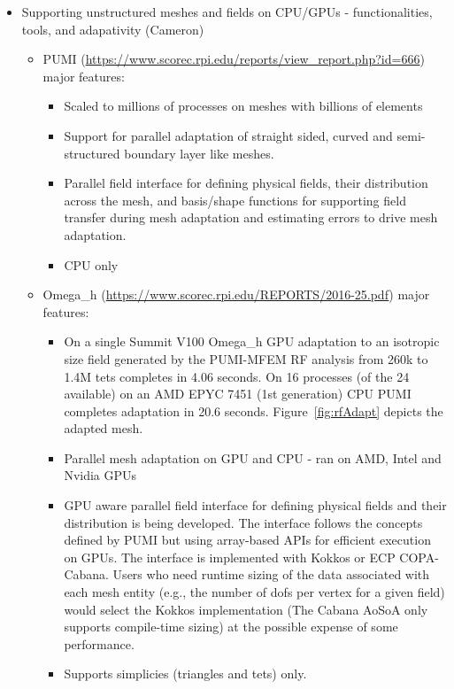 \documentclass[12pt]{article}
\begin{document}
\begin{itemize}
\begin{itemize}
    \end{itemize}
    \item Supporting unstructured meshes and fields on CPU/GPUs - functionalities, tools, and adapativity (Cameron)
    \begin{itemize}
      \item PUMI (\url{https://www.scorec.rpi.edu/reports/view_report.php?id=666}) major features:
      \begin{itemize}
        \item Scaled to millions of processes on meshes with billions of elements
        \item Support for parallel adaptation of straight sided, curved and semi-structured boundary layer like meshes.
        \item Parallel field interface for defining physical fields, their distribution across the mesh, and basis/shape functions for supporting field transfer during mesh adaptation and estimating errors to drive mesh adaptation.
        \item CPU only
      \end{itemize}
      \item Omega\_h (\url{https://www.scorec.rpi.edu/REPORTS/2016-25.pdf}) major features:
      \begin{itemize}
        \item On a single Summit V100 Omega\_h GPU adaptation to an isotropic size field generated by the PUMI-MFEM RF analysis from 260k to 1.4M tets completes in 4.06 seconds.  On 16 processes (of the 24 available) on an AMD EPYC 7451 (1st generation) CPU PUMI completes adaptation in 20.6 seconds.  Figure~\ref{fig:rfAdapt} depicts the adapted mesh. 
        \item Parallel mesh adaptation on GPU and CPU - ran on AMD, Intel and Nvidia GPUs
        \item GPU aware parallel field interface for defining physical fields and their distribution is being developed.  The interface follows the concepts defined by PUMI but using array-based APIs for efficient execution on GPUs.  The interface is implemented with Kokkos or ECP COPA-Cabana.  Users who need runtime sizing of the data associated with each mesh entity (e.g., the number of dofs per vertex for a given field) would select the Kokkos implementation (The Cabana AoSoA only supports compile-time sizing) at the possible expense of some performance. %
        \item Supports simplicies (triangles and tets) only.
      \end{itemize}
    \end{itemize}
\end{itemize}
\end{document}
